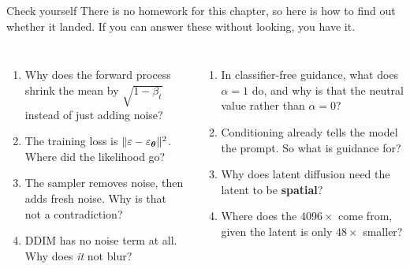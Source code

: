 \documentclass[aspectratio=169]{beamer}
\begin{document}
\begin{frame}{Check yourself}
  \small
  There is no homework for this chapter, so here is how to find out whether it landed. If
  you can answer these without looking, you have it.
  \vskip 5pt
  \begin{columns}[T]
    \footnotesize
    \begin{enumerate}\setlength\itemsep{3pt}
      \item Why does the forward process shrink the mean by $\sqrt{1-\beta_t}$ instead of
        just adding noise?
      \item The training loss is $\|\varepsilon-\varepsilon_{\bm{\theta}}\|^2$. Where did the likelihood go?
      \item The sampler removes noise, then adds fresh noise. Why is that not a
        contradiction?
      \item DDIM has no noise term at all. Why does \emph{it} not blur?
    \end{enumerate}
    \footnotesize
    \begin{enumerate}\setlength\itemsep{3pt}
      \setcounter{enumi}{4}
      \item In classifier-free guidance, what does $\alpha=1$ do, and why is that the
        neutral value rather than $\alpha=0$?
      \item Conditioning already tells the model the prompt. So what is guidance for?
      \item Why does latent diffusion need the latent to be \textbf{spatial}?
      \item Where does the $4096\times$ come from, given the latent is only $48\times$
        smaller?
    \end{enumerate}
  \end{columns}
  \vskip 6pt
\end{frame}
\end{document}
